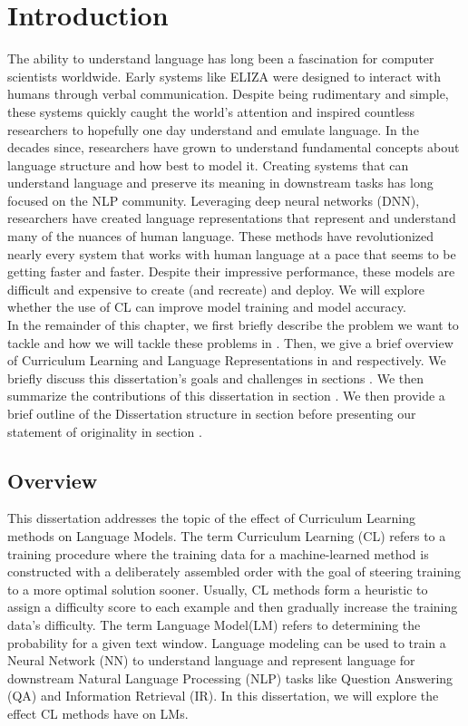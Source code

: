 \chapter {Introduction}
\label{chap:intro:sec:intro}
The ability to understand language has long been a fascination for computer scientists worldwide. Early systems like ELIZA \cite{Weizenbaum1966ELIZAA} were designed to interact with humans through verbal communication. Despite being rudimentary and simple, these systems quickly caught the world's attention and inspired countless researchers to hopefully one day understand and emulate language.  In the decades since, researchers have grown to understand fundamental concepts about language structure and how best to model it. Creating systems that can understand language and preserve its meaning in downstream tasks has long focused on the NLP community. Leveraging deep neural networks (DNN), researchers have created language representations that represent and understand many of the nuances of human language. These methods have revolutionized nearly every system that works with human language at a pace that seems to be getting faster and faster. Despite their impressive performance, these models are difficult and expensive to create (and recreate) and deploy. We will explore whether the use of CL can improve model training and model accuracy.\\
In the remainder of this chapter, we first briefly describe the problem we want to tackle and how we will tackle these problems in . Then, we give a brief overview of Curriculum Learning and Language Representations in  and  respectively. We briefly discuss this dissertation's goals and challenges in sections . We then summarize the contributions of this dissertation in section . We then provide a brief outline of the Dissertation structure in section  before presenting our statement of originality in section .
\section{Overview}
\label{chap:intro:sec:overview}
This dissertation addresses the topic of the effect of Curriculum Learning methods on Language Models. The term Curriculum Learning (CL) refers to a training procedure where the training data for a machine-learned method is constructed with a deliberately assembled order with the goal of steering training to a more optimal solution sooner. Usually, CL methods form a heuristic to assign a difficulty score to each example and then gradually increase the training data's difficulty. The term Language Model(LM) refers to determining the probability for a given text window. Language modeling can be used to train a Neural Network (NN) to understand language and represent language for downstream Natural Language Processing (NLP) tasks like Question Answering (QA) and Information Retrieval (IR). In this dissertation, we will explore the effect CL methods have on LMs.
